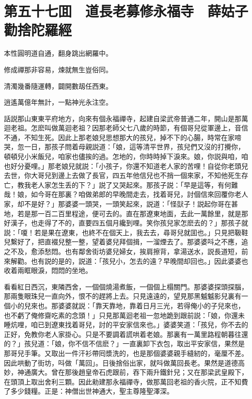 
\chapter*{第五十七囬　道長老募修永福寺　薛姑子勸捨陀羅經}

本性圓明道自通，翻身跳出網羅中。

修成禪那非容易，煉就無生豈俗同。

清濁幾番隨運轉，闢開數刼任西東。

逍遙萬億年無計，一點神光永注空。

話説那山東東平府地方，向來有個永福禪寺，起建自梁武帝普通二年，開山是那萬迴老祖。怎麽叫做萬迴老祖？因那老師父七八歲的時節，有個哥兒從軍邊上，音信不通，不知生死。因此上那老娘兒思想那大的孩兒，掉不下的心腸，時常在家啼哭，忽一日，那孩子問着母親説道：「娘，這等清平世界，孩兒們又沒的打攪你，頓頓兒小米飯兒，咱家也儘挨的過。怎地的，你時時掉下淚來。娘，你説與咱，咱也好分憂哩。」那老娘兒就説：「小孩子，你還不知道老人家的苦哩！自從你老頭兒去世，你大哥兒到邊上去做了長官，四五年他信兒也不捎一個來家，不知他死生存亡，教我老人家怎生丢的下？」説了又哭起來。那孩子説：「早是這等，有何難哉！娘，如今哥在那裏？咱做弟郎的早晚間走去，找着哥兒，討個信來回覆你老人家，却不是好？」那婆婆一頭哭，一頭笑起來，説道：「怪獃子！説起你哥在甚地，若是那一百二百里程途，便可去的。直在那遼東地面，去此一萬餘里，就是那好漢子，也走得了不的，直要四五個月纔到哩。笑你孩兒家怎麽去的？」那孩子就説：「嗄！若是果在遼東，也終不在個天上，我去去，尋哥兒就囬也。」只見把靸鞋兒繫好了，把直裰兒整一整，望着婆兒拜個揖，一溜煙去了。那婆婆呌之不應，追之不及，愈添愁悶。也有鄰舍街坊婆兒婦女，挨肩擦背，拿湯送水，説長道短，前來解勸。也有説的是的，説道：「孩兒小，怎去的遠？早晚間却回也。」因此婆婆也收着兩眶眼淚，悶悶的坐地。

看看紅日西沉，東隣西舍，一個個燒湯煮飯，一個個上榻關門。那婆婆探頭探腦，那兩隻眼珠兒一直向外，恨不的趕將上去。只見遠遠的，望見那黑魆魆影兒裏有一個小的兒來也。那婆婆就説：「靠天靠地，靠着日月三光，若得俺小的子兒來也，也不虧了俺修齋吃素的念頭！」只見那萬迴老祖一忽地跪到跟前説：「娘，你還未睡炕哩，咱已到遼東找着哥兒，討的平安家信來也。」婆婆笑道：「孩兒，你不去的正好，免教你老人家掛心。只是不要調着謊哄着老娘。那裏有一萬里路程朝暮往還的？」孩兒道：「娘，你不信不信麽？」一直裏卸下衣包，取出平安家信，果然是那哥兒手筆。又取出一件汗衫帶囘漿洗的，也是那個婆婆親手縫紉的，毫厘不差。因此哄動了街坊，呌做「萬回」。日後捨俗出家，就呌做萬回長老。果然是道德高妙，神通廣大。曾在那後趙皇帝石虎跟前，吞下兩升鐵針兒；又在那梁武皇殿下，在頭頂上取出舍利三顆。因此勑建那永福禪寺，做那萬回老祖的香火院，正不知費了多少錢糧。正是：神僧出世神通大，聖主尊隆聖澤深。

